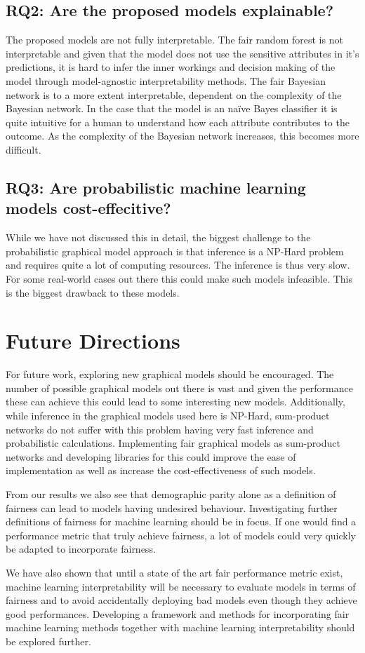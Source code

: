 \subsection{RQ2: Are the proposed models explainable?}

The proposed models are not fully interpretable. The fair random forest is not interpretable and given that the model does not use the sensitive attributes in it's predictions, it is hard to infer the inner workings and decision making of the model through model-agnostic interpretability methods. The fair Bayesian network is to a more extent interpretable, dependent on the complexity of the Bayesian network. In the case that the model is an naïve Bayes classifier it is quite intuitive for a human to understand how each attribute contributes to the outcome. As the complexity of the Bayesian network increases, this becomes more difficult. 

\subsection{RQ3: Are probabilistic machine learning models cost-effecitive?}

While we have not discussed this in detail, the biggest challenge to the probabilistic graphical model approach is that inference is a NP-Hard problem and requires quite a lot of computing resources. The inference is thus very slow. For some real-world cases out there this could make such models infeasible. This is the biggest drawback to these models. 

\section{Future Directions}
\label{sec:conclusions:future}

For future work, exploring new graphical models should be encouraged. The number of possible graphical models out there is vast and given the performance these can achieve this could lead to some interesting new models. Additionally, while inference in the graphical models used here is NP-Hard, sum-product networks do not suffer with this problem having very fast inference and probabilistic calculations. Implementing fair graphical models as sum-product networks and developing libraries for this could improve the ease of implementation as well as increase the cost-effectiveness of such models.

From our results we also see that demographic parity alone as a definition of fairness can lead to models having undesired behaviour. Investigating further definitions of fairness for machine learning should be in focus. If one would find a performance metric that truly achieve fairness, a lot of models could very quickly be adapted to incorporate fairness. 

We have also shown that until a state of the art fair performance metric exist, machine learning interpretability will be necessary to evaluate models in terms of fairness and to avoid accidentally deploying bad models even though they achieve good performances. Developing a framework and methods for incorporating fair machine learning methods together with machine learning interpretability should be explored further.